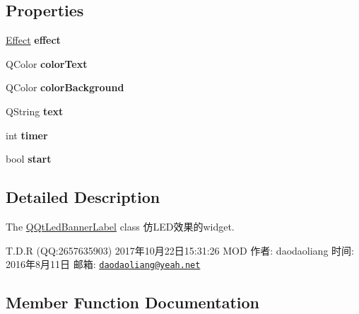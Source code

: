 \subsection*{Properties}
\begin{DoxyCompactItemize}
\item 
\mbox{\label{class_q_qt_led_banner_label_a5b73ad64f34a1c682d08f9fe92b69d0f}} 
\mbox{\hyperlink{class_q_qt_led_banner_label_a8ea55a34d54e6fe09a74c5fd2d83e5dc}{Effect}} {\bfseries effect}
\item 
\mbox{\label{class_q_qt_led_banner_label_ad8c9a6d7a239691f83dc311644b4e3c5}} 
Q\+Color {\bfseries color\+Text}
\item 
\mbox{\label{class_q_qt_led_banner_label_a82dea8c769df2faaa1376788424c7e35}} 
Q\+Color {\bfseries color\+Background}
\item 
\mbox{\label{class_q_qt_led_banner_label_a1f058dd552a548c4eef8e066b146edbe}} 
Q\+String {\bfseries text}
\item 
\mbox{\label{class_q_qt_led_banner_label_a85bdb3f2771070e8422599e292ae3592}} 
int {\bfseries timer}
\item 
\mbox{\label{class_q_qt_led_banner_label_a983d60295321672a349a2b07f20a617c}} 
bool {\bfseries start}
\end{DoxyCompactItemize}


\subsection{Detailed Description}
The \mbox{\hyperlink{class_q_qt_led_banner_label}{Q\+Qt\+Led\+Banner\+Label}} class 仿\+L\+E\+D效果的widget. 

T.\+D.\+R (QQ\+:2657635903) 2017年10月22日15\+:31\+:26 M\+OD 作者\+: daodaoliang 时间\+: 2016年8月11日 邮箱\+: \href{mailto:daodaoliang@yeah.net}{\tt daodaoliang@yeah.\+net} 

\subsection{Member Function Documentation}
\mbox{\label{class_q_qt_led_banner_label_a15864eb5288ce5a04d481e81db8c9ccd}} 
